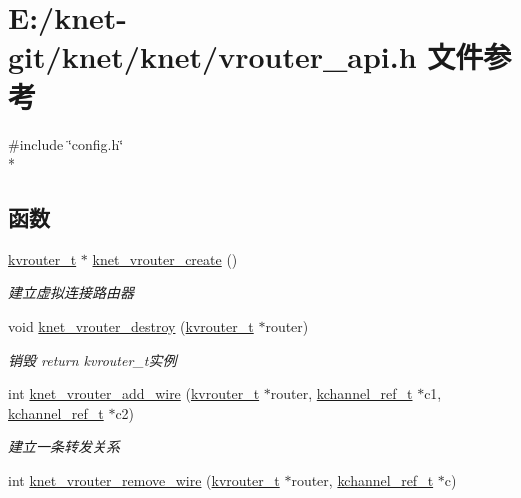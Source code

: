 \hypertarget{a00126}{}\section{E\+:/knet-\/git/knet/knet/vrouter\+\_\+api.h 文件参考}
\label{a00126}
{\ttfamily \#include \char`\"{}config.\+h\char`\"{}}\\*
\subsection*{函数}
\begin{DoxyCompactItemize}
\item 
\hyperlink{a00066_a9863a6202df1fb40e2b32c673ad93267_a9863a6202df1fb40e2b32c673ad93267}{kvrouter\+\_\+t} $\ast$ \hyperlink{a00141_gac2a99e706273f22db2ea363b1700bfab_gac2a99e706273f22db2ea363b1700bfab}{knet\+\_\+vrouter\+\_\+create} ()
\begin{DoxyCompactList}\small\item\em 建立虚拟连接路由器 \end{DoxyCompactList}\item 
void \hyperlink{a00141_gad0660abac611870c1255dcfe9d36f67e_gad0660abac611870c1255dcfe9d36f67e}{knet\+\_\+vrouter\+\_\+destroy} (\hyperlink{a00066_a9863a6202df1fb40e2b32c673ad93267_a9863a6202df1fb40e2b32c673ad93267}{kvrouter\+\_\+t} $\ast$router)
\begin{DoxyCompactList}\small\item\em 销毁 return kvrouter\+\_\+t实例 \end{DoxyCompactList}\item 
int \hyperlink{a00141_ga7256979701c32356201e853b7f3df1ca_ga7256979701c32356201e853b7f3df1ca}{knet\+\_\+vrouter\+\_\+add\+\_\+wire} (\hyperlink{a00066_a9863a6202df1fb40e2b32c673ad93267_a9863a6202df1fb40e2b32c673ad93267}{kvrouter\+\_\+t} $\ast$router, \hyperlink{a00066_a3b7e82599367eade261456f60ebe2cd9_a3b7e82599367eade261456f60ebe2cd9}{kchannel\+\_\+ref\+\_\+t} $\ast$c1, \hyperlink{a00066_a3b7e82599367eade261456f60ebe2cd9_a3b7e82599367eade261456f60ebe2cd9}{kchannel\+\_\+ref\+\_\+t} $\ast$c2)
\begin{DoxyCompactList}\small\item\em 建立一条转发关系 \end{DoxyCompactList}\item 
int \hyperlink{a00141_gaa5052bac7f443e497fcc042f13026bfc_gaa5052bac7f443e497fcc042f13026bfc}{knet\+\_\+vrouter\+\_\+remove\+\_\+wire} (\hyperlink{a00066_a9863a6202df1fb40e2b32c673ad93267_a9863a6202df1fb40e2b32c673ad93267}{kvrouter\+\_\+t} $\ast$router, \hyperlink{a00066_a3b7e82599367eade261456f60ebe2cd9_a3b7e82599367eade261456f60ebe2cd9}{kchannel\+\_\+ref\+\_\+t} $\ast$c)

\end{DoxyCompactItemize}
